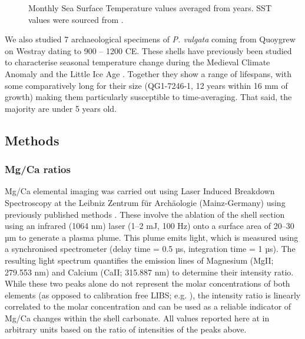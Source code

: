 \documentclass[
  authoryear,
  preprint,
  3p]{elsarticle}
\begin{document}
\begin{figure}[H]


\caption{\label{fig-SSTs}Monthly Sea Surface Temperature values averaged
from years. SST values were sourced from \citet{Good2020-nl}.}

\end{figure}%

We also studied 7 archaeological specimens of \emph{P. vulgata} coming
from Quoygrew on Westray dating to 900 -- 1200 CE. These shells have
previously been studied to characterise seasonal temperature change
during the Medieval Climate Anomaly and the Little Ice Age
\citep{Surge2012-ba}. Together they show a range of lifespans, with some
comparatively long for their size (QG1-7246-1, 12 years within 16 mm of
growth) making them particularly susceptible to time-averaging. That
said, the majority are under 5 years old.

\subsection{Methods}\label{methods}

\subsubsection{Mg/Ca ratios}\label{mgca-ratios}

Mg/Ca elemental imaging was carried out using Laser Induced Breakdown
Spectroscopy at the Leibniz Zentrum für Archäologie (Mainz-Germany)
using previously published methods \citep{Hausmann2023-ih}. These
involve the ablation of the shell section using an infrared (1064 nm)
laser (1--2 mJ, 100 Hz) onto a surface area of 20--30 µm to generate a
plasma plume. This plume emits light, which is measured using a
synchronised spectrometer (delay time = 0.5 µs, integration time = 1
µs). The resulting light spectrum quantifies the emission lines of
Magnesium (MgII; 279.553 nm) and Calcium (CaII; 315.887 nm) to determine
their intensity ratio. While these two peaks alone do not represent the
molar concentrations of both elements (as opposed to calibration free
LIBS; e.g. \citep{Martinez-Minchero2022-jz}), the intensity ratio is
linearly correlated to the molar concentration \citep{Hausmann2017-oa}
and can be used as a reliable indicator of Mg/Ca changes within the
shell carbonate. All values reported here at in arbitrary units based on
the ratio of intensities of the peaks above.
\end{document}
